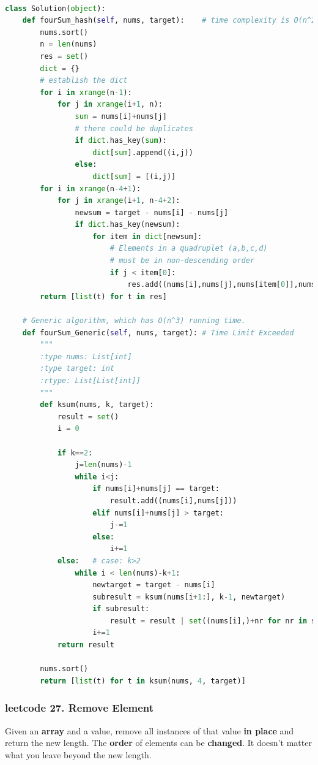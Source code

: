 \documentclass[a4paper,10pt]{article}
\begin{document}
\begin{lstlisting}[language=Python, caption=Problem18. 4Sum]

class Solution(object):
    def fourSum_hash(self, nums, target):    # time complexity is O(n^2)
        nums.sort()
        n = len(nums)
        res = set()
        dict = {}
        # establish the dict
        for i in xrange(n-1):
            for j in xrange(i+1, n):
                sum = nums[i]+nums[j]
                # there could be duplicates
                if dict.has_key(sum):
                    dict[sum].append((i,j))
                else:
                    dict[sum] = [(i,j)]
        for i in xrange(n-4+1):
            for j in xrange(i+1, n-4+2):
                newsum = target - nums[i] - nums[j]
                if dict.has_key(newsum):
                    for item in dict[newsum]:
                        # Elements in a quadruplet (a,b,c,d)
                        # must be in non-descending order
                        if j < item[0]:
                            res.add((nums[i],nums[j],nums[item[0]],nums[item[1]]))
        return [list(t) for t in res]

    # Generic algorithm, which has O(n^3) running time.
    def fourSum_Generic(self, nums, target): # Time Limit Exceeded
        """
        :type nums: List[int]
        :type target: int
        :rtype: List[List[int]]
        """
        def ksum(nums, k, target):
            result = set()
            i = 0
            
            if k==2:
                j=len(nums)-1
                while i<j:
                    if nums[i]+nums[j] == target:
                        result.add((nums[i],nums[j]))
                    elif nums[i]+nums[j] > target:
                        j-=1
                    else:
                        i+=1
            else:   # case: k>2
                while i < len(nums)-k+1:
                    newtarget = target - nums[i]
                    subresult = ksum(nums[i+1:], k-1, newtarget)
                    if subresult:
                        result = result | set((nums[i],)+nr for nr in subresult)
                    i+=1
            return result
        
        nums.sort()
        return [list(t) for t in ksum(nums, 4, target)]
\end{lstlisting}



\subsubsection{leetcode 27. Remove Element}
Given an \textbf{array} and a value, remove all instances of that value \textbf{in place} and return the new length. The \textbf{order} of elements can be \textbf{changed}. It doesn't matter what you leave beyond the new length.\\
\end{document}
